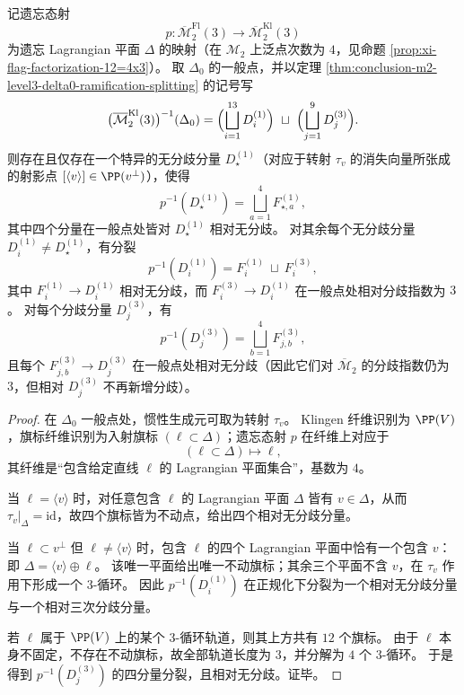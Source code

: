 \begin{theorem}\label{thm:conclusion-m2-level3-flag-over-klingen-delta0-refined-splitting}
记遗忘态射
\[
p:\overline{\mathcal M}_2^{\mathrm{Fl}}(3)\longrightarrow \overline{\mathcal M}_2^{\mathrm{Kl}}(3)
\]
为遗忘 Lagrangian 平面 \(\Delta\) 的映射（在 \(\mathcal M_2\) 上泛点次数为 \(4\)，见命题 \ref{prop:xi-flag-factorization-12=4x3}）。
取 \(\Delta_0\) 的一般点，并以定理 \ref{thm:conclusion-m2-level3-delta0-ramification-splitting} 的记号写
\[
\bigl(\overline{\mathcal M}_2^{\mathrm{Kl}}(3)\bigr)^{-1}(\Delta_0)
=\Bigl(\bigsqcup_{i=1}^{13}D_i^{(1)}\Bigr)\ \sqcup\ \Bigl(\bigsqcup_{j=1}^{9}D_j^{(3)}\Bigr).
\]
则存在且仅存在一个特异的无分歧分量 \(D_\star^{(1)}\)（对应于转射 \(\tau_v\) 的消失向量所张成的射影点 \([\langle v\rangle]\in \PP(v^\perp)\)），使得
\[
p^{-1}(D_\star^{(1)})=\bigsqcup_{a=1}^{4}F_{\star,a}^{(1)},
\]
其中四个分量在一般点处皆对 \(D_\star^{(1)}\) 相对无分歧。
对其余每个无分歧分量 \(D_i^{(1)}\neq D_\star^{(1)}\)，有分裂
\[
p^{-1}(D_i^{(1)})=F_{i}^{(1)}\ \sqcup\ F_{i}^{(3)},
\]
其中 \(F_i^{(1)}\to D_i^{(1)}\) 相对无分歧，而 \(F_i^{(3)}\to D_i^{(1)}\) 在一般点处相对分歧指数为 \(3\)。
对每个分歧分量 \(D_j^{(3)}\)，有
\[
p^{-1}(D_j^{(3)})=\bigsqcup_{b=1}^{4}F_{j,b}^{(3)},
\]
且每个 \(F_{j,b}^{(3)}\to D_j^{(3)}\) 在一般点处相对无分歧（因此它们对 \(\overline{\mathcal M}_2\) 的分歧指数仍为 \(3\)，但相对 \(D_j^{(3)}\) 不再新增分歧）。
\end{theorem}
\begin{proof}
在 \(\Delta_0\) 一般点处，惯性生成元可取为转射 \(\tau_v\)。
Klingen 纤维识别为 \(\PP(V)\)，旗标纤维识别为入射旗标 \((\ell\subset \Delta)\)；遗忘态射 \(p\) 在纤维上对应于
\[
(\ell\subset \Delta)\longmapsto \ell,
\]
其纤维是“包含给定直线 \(\ell\) 的 Lagrangian 平面集合”，基数为 \(4\)。
\par
当 \(\ell=\langle v\rangle\) 时，对任意包含 \(\ell\) 的 Lagrangian 平面 \(\Delta\) 皆有 \(v\in \Delta\)，从而 \(\tau_v|_\Delta=\mathrm{id}\)，故四个旗标皆为不动点，给出四个相对无分歧分量。
\par
当 \(\ell\subset v^\perp\) 但 \(\ell\neq \langle v\rangle\) 时，包含 \(\ell\) 的四个 Lagrangian 平面中恰有一个包含 \(v\)：即 \(\Delta=\langle v\rangle\oplus \ell\)。
该唯一平面给出唯一不动旗标；其余三个平面不含 \(v\)，在 \(\tau_v\) 作用下形成一个 \(3\)-循环。
因此 \(p^{-1}(D_i^{(1)})\) 在正规化下分裂为一个相对无分歧分量与一个相对三次分歧分量。
\par
若 \(\ell\) 属于 \(\PP(V)\) 上的某个 \(3\)-循环轨道，则其上方共有 \(12\) 个旗标。
由于 \(\ell\) 本身不固定，不存在不动旗标，故全部轨道长度为 \(3\)，并分解为 \(4\) 个 \(3\)-循环。
于是得到 \(p^{-1}(D_j^{(3)})\) 的四分量分裂，且相对无分歧。证毕。
\end{proof}

